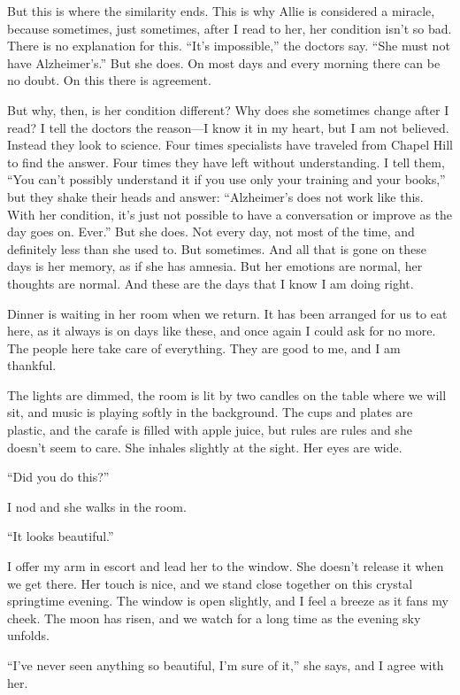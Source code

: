\documentclass[10pt, twoside, openright]{book}
\begin{document}
But this is where the similarity ends. This is why Allie is considered a
miracle, because sometimes, just sometimes, after I read to her, her
condition isn't so bad. There is no explanation for this. ``It's
impossible,'' the doctors say. ``She must not have Alzheimer's.'' But
she does. On most days and every morning there can be no doubt. On this
there is agreement.

But why, then, is her condition different? Why does she sometimes change
after I read? I tell the doctors the reason---I know it in my heart, but
I am not believed. Instead they look to science. Four times specialists
have traveled from Chapel Hill to find the answer. Four times they have
left without understanding. I tell them, ``You can't possibly understand
it if you use only your training and your books,'' but they shake their
heads and answer: ``Alzheimer's does not work like this. With her
condition, it's just not possible to have a conversation or improve as
the day goes on. Ever.'' But she does. Not every day, not most of the
time, and definitely less than she used to. But sometimes. And all that
is gone on these days is her memory, as if she has amnesia. But her
emotions are normal, her thoughts are normal. And these are the days
that I know I am doing right.

Dinner is waiting in her room when we return. It has been arranged for
us to eat here, as it always is on days like these, and once again I
could ask for no more. The people here take care of everything. They are
good to me, and I am thankful.

The lights are dimmed, the room is lit by two candles on the table where
we will sit, and music is playing softly in the background. The cups and
plates are plastic, and the carafe is filled with apple juice, but rules
are rules and she doesn't seem to care. She inhales slightly at the
sight. Her eyes are wide.


``Did you do this?''

I nod and she walks in the room.

``It looks beautiful.''


I offer my arm in escort and lead her to the window. She doesn't release
it when we get there. Her touch is nice, and we stand close together on
this crystal springtime evening. The window is open slightly, and I feel
a breeze as it fans my cheek. The moon has risen, and we watch for a
long time as the evening sky unfolds.

``I've never seen anything so beautiful, I'm sure of it,'' she says, and
I agree with her.
\end{document}
